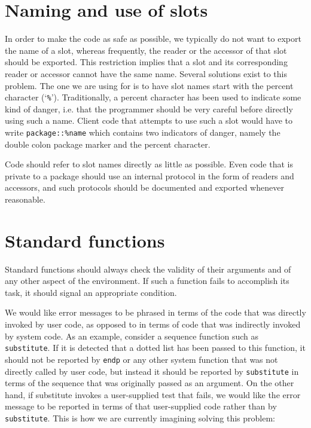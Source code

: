 \section{Naming and use of slots}

In order to make the code as safe as possible, we typically do not
want to export the name of a slot, whereas frequently, the reader or
the accessor of that slot should be exported.  This restriction
implies that a slot and its corresponding reader or accessor cannot
have the same name.  Several solutions exist to this problem.  The one
we are using for \sysname{} is to have slot names start with the
percent character (`\texttt{\%}').  Traditionally, a percent character
has been used to indicate some kind of danger, i.e. that the
programmer should be very careful before directly using such a name.
Client code that attempts to use such a slot would have to write
\texttt{package::\%name} which contains two indicators of danger,
namely the double colon package marker and the percent character.

Code should refer to slot names directly as little as possible.  Even
code that is private to a package should use an internal protocol in
the form of readers and accessors, and such protocols should be
documented and exported whenever reasonable. 

\section{Standard functions}

Standard functions should always check the validity of their arguments
and of any other aspect of the environment.  If such a function fails
to accomplish its task, it should signal an appropriate condition.  

We would like error messages to be phrased in terms of the code that
was directly invoked by user code, as opposed to in terms of code that
was indirectly invoked by system code.  As an example, consider a
sequence function such as \texttt{substitute}.  If it is detected that
a dotted list has been passed to this function, it should not be
reported by \texttt{endp} or any other system function that was not
directly called by user code, but instead it should be reported by
\texttt{substitute} in terms of the sequence that was originally
passed as an argument.  On the other hand, if substitute invokes a
user-supplied test that fails, we would like the error message to be
reported in terms of that user-supplied code rather than by
\texttt{substitute}.  This is how we are currently imagining solving
this problem:

